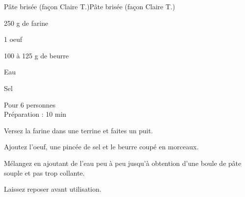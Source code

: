 \begin{recette}{Pâte brisée (façon Claire T.)}{Pâte brisée (façon Claire T.)}

\begin{ingredients}
250 g de farine\par
1 oeuf\par
100 à 125 g de beurre\par
Eau\par
Sel\par
\end{ingredients}

\begin{infos}
Pour 6 personnes\\
Préparation : 10 min\\
\end{infos}

\begin{etapes}
\item Versez la farine dans une terrine et faites un puit.
\item Ajoutez l'oeuf, une pincée de sel et le beurre coupé en morceaux.
\item Mélangez en ajoutant de l'eau peu à peu jusqu'à obtention d'une boule de pâte souple et pas trop collante.
\item Laissez reposer avant utilisation.
\end{etapes}

\end{recette}